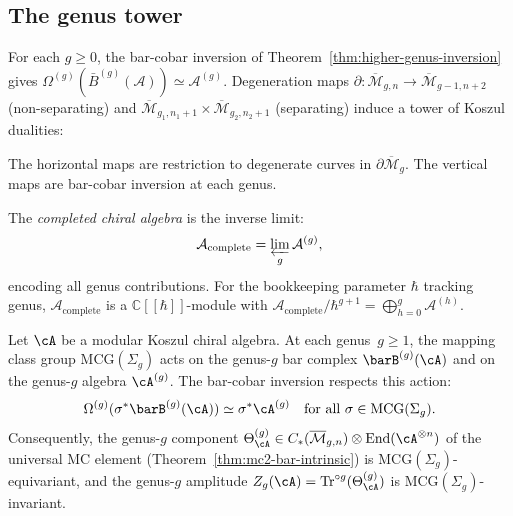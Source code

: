 \subsection{The genus tower}

For each $g \geq 0$, the bar-cobar inversion of Theorem~\ref{thm:higher-genus-inversion}
gives $\Omega^{(g)}(\bar{B}^{(g)}(\mathcal{A})) \simeq \mathcal{A}^{(g)}$.
Degeneration maps $\partial\colon \overline{\mathcal{M}}_{g,n} \to
\overline{\mathcal{M}}_{g-1,n+2}$ (non-separating) and
$\overline{\mathcal{M}}_{g_1,n_1+1} \times \overline{\mathcal{M}}_{g_2,n_2+1}$
(separating) induce a tower of Koszul dualities:
\begin{center}
\end{center}
The horizontal maps are restriction to degenerate curves in $\partial\overline{\mathcal{M}}_g$.
The vertical maps are bar-cobar inversion at each genus.

\begin{definition}\label{def:completed-chiral-algebra}
The \emph{completed chiral algebra} is the inverse limit:
\[
\mathcal{A}_{\mathrm{complete}}
= \varprojlim_g \mathcal{A}^{(g)},
\]
encoding all genus contributions.  For the bookkeeping parameter $\hbar$ tracking genus,
$\mathcal{A}_{\mathrm{complete}}$ is a $\mathbb{C}[\![\hbar]\!]$-module with
$\mathcal{A}_{\mathrm{complete}} / \hbar^{g+1} = \bigoplus_{h=0}^{g} \mathcal{A}^{(h)}$.
\end{definition}

\begin{proposition}
\label{prop:mcg-equivariance-tower}\label{rem:modular-invariance-tower}
Let $\cA$ be a modular Koszul chiral algebra.
At each genus~$g \geq 1$, the mapping class group
$\mathrm{MCG}(\Sigma_g)$ acts on the genus-$g$ bar complex
$\barB^{(g)}(\cA)$ and on the genus-$g$ algebra $\cA^{(g)}$.
The bar-cobar inversion respects this action:
\[
\Omega^{(g)}(\sigma^* \barB^{(g)}(\cA))
\simeq \sigma^* \cA^{(g)}
\quad \text{for all } \sigma \in \mathrm{MCG}(\Sigma_g).
\]
Consequently, the genus-$g$ component
$\Theta_\cA^{(g)} \in
C_*(\overline{\mathcal{M}}_{g,n}) \otimes
\operatorname{End}(\cA^{\otimes n})$
of the universal MC element
\textup{(}Theorem~\textup{\ref{thm:mc2-bar-intrinsic})} is
$\mathrm{MCG}(\Sigma_g)$-equivariant, and the genus-$g$
amplitude $Z_g(\cA) = \operatorname{Tr}^{\circ g}(\Theta_\cA^{(g)})$
is $\mathrm{MCG}(\Sigma_g)$-invariant.
\end{proposition}


